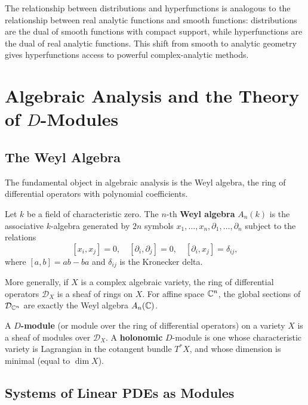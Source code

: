 The relationship between distributions and hyperfunctions is analogous to the relationship between real analytic functions and smooth functions: distributions are the dual of smooth functions with compact support, while hyperfunctions are the dual of real analytic functions. This shift from smooth to analytic geometry gives hyperfunctions access to powerful complex-analytic methods.

\section{Algebraic Analysis and the Theory of \texorpdfstring{\(D\)}{D}-Modules}

\subsection{The Weyl Algebra}

The fundamental object in algebraic analysis is the Weyl algebra, the ring of differential operators with polynomial coefficients.

\begin{definition}
Let \(k\) be a field of characteristic zero. The \(n\)-th \textbf{Weyl algebra} \(A_n(k)\) is the associative \(k\)-algebra generated by \(2n\) symbols \(x_1,\dots,x_n, \partial_1,\dots,\partial_n\) subject to the relations
\[
[x_i, x_j] = 0,\quad [\partial_i, \partial_j] = 0,\quad [\partial_i, x_j] = \delta_{ij},
\]
where \([a,b] = ab - ba\) and \(\delta_{ij}\) is the Kronecker delta.
\end{definition}

More generally, if \(X\) is a complex algebraic variety, the ring of differential operators \(\mathcal{D}_X\) is a sheaf of rings on \(X\). For affine space \(\mathbb{C}^n\), the global sections of \(\mathcal{D}_{\mathbb{C}^n}\) are exactly the Weyl algebra \(A_n(\mathbb{C})\).

\begin{definition}[\(D\)-Module]
A \textbf{\(D\)-module} (or module over the ring of differential operators) on a variety \(X\) is a sheaf of modules over \(\mathcal{D}_X\). A \textbf{holonomic} \(D\)-module is one whose characteristic variety is Lagrangian in the cotangent bundle \(T^*X\), and whose dimension is minimal (equal to \(\dim X\)).
\end{definition}

\subsection{Systems of Linear PDEs as Modules}

